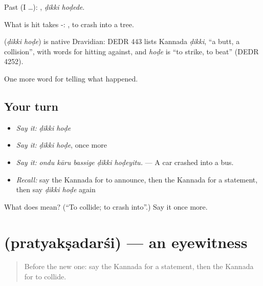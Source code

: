 Past (I …):  , \emph{ḍikki hoḍede}.

What is hit takes -:   , to crash into a tree.

\begin{cousinweb}
\textbf{ } (\emph{ḍikki hoḍe}) is native Dravidian: DEDR 443 lists Kannada \emph{ḍikki}, \textquotedblleft{}a butt, a collision\textquotedblright{}, with words for hitting against, and \emph{hoḍe} is \textquotedblleft{}to strike, to beat\textquotedblright{} (DEDR 4252).
\end{cousinweb}

\begin{grammarlens}[title={What you've built}]
One more word for telling what happened.
\end{grammarlens}

\subsection*{Your turn}
\begin{itemize}
\raggedright
  \item \emph{Say it:} \emph{ḍikki hoḍe}
  \item \emph{Say it:} \emph{ḍikki hoḍe}, once more
  \item \emph{Say it:} \emph{ondu kāru bassige ḍikki hoḍeyitu.} — A car crashed into a bus.
  \item \emph{Recall:} say the Kannada for to announce, then the Kannada for a statement, then say \emph{ḍikki hoḍe} again
\end{itemize}

\begin{tcolorbox}[breakable,colback=teal!4,colframe=teal!35!black,title={Before you move on}]
What does   mean? (\textquotedblleft{}To collide; to crash into\textquotedblright{}.) Say it once more.
\end{tcolorbox}
\section[\texorpdfstring{\kn{ಪ್ರತ್ಯಕ್ಷದರ್ಶಿ} (pratyakṣadarśi)}{ಪ್ರತ್ಯಕ್ಷದರ್ಶಿ (pratyakṣadarśi)}]{ (pratyakṣadarśi) — an eyewitness}

\label{lesson:KA-C330-pratyaksadarsi}



\begin{quote}
Before the new one: say the Kannada for a statement, then the Kannada for to collide.
\end{quote}

